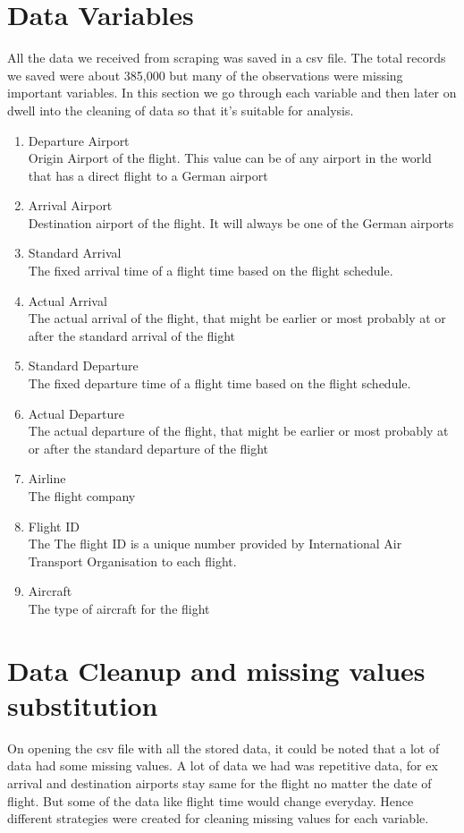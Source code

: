 \section{Data Variables}
All the data we received from scraping was saved in a csv file.
The total records we saved were about 385,000 but many of the observations were missing important variables. In this section we go through each variable and then later on dwell into the cleaning of data so that it's suitable for analysis.
\begin{enumerate}
    \item {Departure Airport}
    \\Origin Airport of the flight. This value can be of any airport in the world that has a direct flight to a German airport
    \item {Arrival Airport}
    \\Destination airport of the flight. It will always be one of the German airports
    \item {Standard Arrival}
    \\The fixed arrival time of a flight time based on the flight schedule.
    \item {Actual Arrival}
    \\The actual arrival of the flight, that might be earlier or most probably at or after the standard arrival of the flight
    \item {Standard Departure}
    \\The fixed departure time of a flight time based on the flight schedule.
    \item {Actual Departure}
    \\The actual departure of the flight, that might be earlier or most probably at or after the standard departure of the flight
    \item {Airline}
    \\The flight company
    \item {Flight ID}
    \\The The flight ID is a unique number provided by International Air Transport Organisation to each flight.
    \item {Aircraft}
    \\The type of aircraft for the flight
\end{enumerate}

\section{Data Cleanup and missing values substitution}
On opening the csv file with all the stored data, it could be noted that a lot of data had some missing values. A lot of data we had was  repetitive data, for ex arrival and destination airports stay same for the flight no matter the date of flight. But some of the data like flight time would change everyday. Hence different strategies were created for cleaning missing values for each variable.

